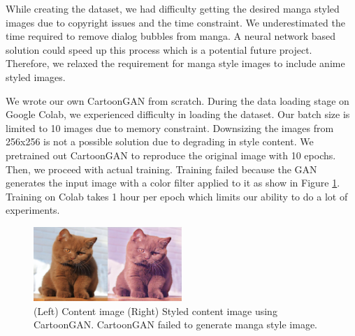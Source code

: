 \documentclass{article}
\begin{document}
While creating the dataset, we had difficulty getting the desired manga styled images due to copyright issues and the time constraint. We underestimated the time required to remove dialog bubbles from manga. A neural network based solution could speed up this process which is a potential future project. Therefore, we relaxed the requirement for manga style images to include anime styled images.

We wrote our own CartoonGAN from scratch. During the data loading stage on Google Colab, we experienced difficulty in loading the dataset. Our batch size is limited to 10 images due to memory constraint. Downsizing the images from 256x256 is not a possible solution due to degrading in style content. We pretrained out CartoonGAN to reproduce the original image with 10 epochs. Then, we proceed with actual training. Training failed because the GAN generates the input image with a color filter applied to it as show in Figure \ref{fig:fail}. Training on Colab takes 1 hour per epoch which limits our ability to do a lot of experiments.

\begin{figure}[th!]
  \centering
  \includegraphics[width=0.5\textwidth, height=0.1\textheight]{figure/cartoongan_fail.png}
  \caption{(Left) Content image (Right) Styled content image using CartoonGAN. CartoonGAN failed to generate manga style image.}
  \label{fig:fail}
\end{figure}

%
\end{document}
